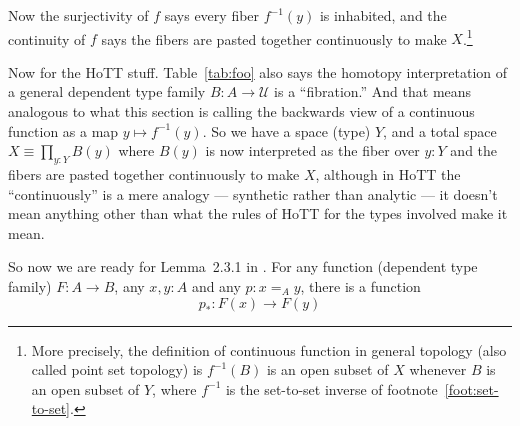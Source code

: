 \documentclass[11pt]{article}
\newcommand{\universe}{\mathcal{U}}
\begin{document}
Now the surjectivity of $f$ says every fiber $f^{-1}(y)$ is inhabited,
and the continuity of $f$ says the fibers are pasted together continuously
to make $X$.\footnote{More precisely, the definition of continuous function
in general topology (also called point set topology) is $f^{-1}(B)$ is an
open subset of $X$ whenever $B$ is an open subset of $Y$, where $f^{-1}$
is the set-to-set inverse of footnote~\ref{foot:set-to-set}.}

Now for the HoTT stuff.  Table~\ref{tab:foo} also says the homotopy
interpretation of a general dependent type family $B : A \to \universe$
is a ``fibration.''  And that means analogous to what this section is
calling the backwards view of a continuous function as
a map $y \mapsto f^{-1}(y)$.  So we have a space (type) $Y$, and a total
space $X \equiv \prod_{y : Y} B(y)$ where $B(y)$ is now interpreted as the
fiber over $y : Y$ and the fibers are pasted together continuously to make $X$,
although in HoTT the ``continuously'' is a mere analogy --- synthetic rather
than analytic --- it doesn't mean anything other than what
the rules of HoTT for the types involved make it mean.

So now we are ready for Lemma~2.3.1 {in} .
For any function (dependent type family) $F : A \to B$,
any $x, y : A$ and any $p : x =_A y$, there is a function
$$
   p_{\textstyle *} : F(x) \to F(y)
$$
\end{document}
